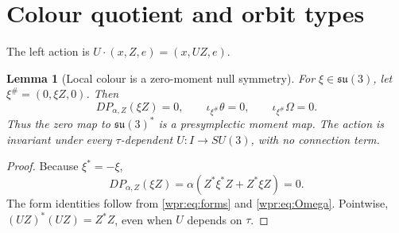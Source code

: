 \documentclass[11pt]{article}
\newtheorem{lemma}[theorem]{Lemma}
\begin{document}
\section{Colour quotient and orbit types}
The left action is \(U\cdot(x,Z,e)=(x,UZ,e)\).

\begin{lemma}[Local colour is a zero-moment null symmetry]
\label{wpr:lem:null}
For \(\xi\in\mathfrak{su}(3)\), let \(\xi^\#=(0,\xi Z,0)\).  Then
\[
 D P_{\alpha,Z}(\xi Z)=0,\qquad
 \iota_{\xi^\#}\theta=0,\qquad
 \iota_{\xi^\#}\Omega=0.
\]
Thus the zero map to \(\mathfrak{su}(3)^*\) is a presymplectic moment
map.  The action is invariant under every \(\tau\)-dependent
\(U:I\to SU(3)\), with no connection term.
\end{lemma}
\begin{proof}
Because \(\xi^*=-\xi\),
\[
 D P_{\alpha,Z}(\xi Z)=
 \alpha(Z^*\xi^*Z+Z^*\xi Z)=0.
\]
The form identities follow from \eqref{wpr:eq:forms} and
\eqref{wpr:eq:Omega}.  Pointwise,
\((UZ)^*(UZ)=Z^*Z\), even when \(U\) depends on \(\tau\).
\end{proof}
\end{document}
